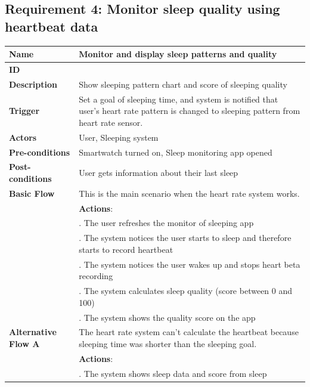 \documentclass{article}
\begin{document}
	\subsection{Requirement 4: Monitor sleep quality using heartbeat data}
	\vspace{1em}
	\begin{center}
		\small
		\begin{tabularx}{1.0\textwidth}{|>{\raggedright\arraybackslash}p{}|>{\raggedright\arraybackslash}X|}
			\hline
			\textbf{Name}               & Monitor and display sleep patterns and quality \\ \hline
			\textbf{ID}                 & 4 \\ \hline
			\textbf{Description}        & Show sleeping pattern chart and score of sleeping quality \\ \hline
			\textbf{Trigger}            & Set a goal of sleeping time, and system is notified that user's heart rate pattern is changed to sleeping pattern from heart rate sensor. \\ \hline
			\textbf{Actors}             & User, Sleeping system \\ \hline
			\textbf{Pre-conditions}     & Smartwatch turned on, Sleep monitoring app opened \\ \hline
			\textbf{Post-conditions}    & User gets information about their last sleep \\ \hline
			\textbf{Basic Flow}         & This is the main scenario when the heart rate system works. \\ \hline
										& \textbf{Actions}: \\
										& 1. The user refreshes the monitor of sleeping app \\
										& 2. The system notices the user starts to sleep and therefore starts to record heartbeat \\
										& 3. The system notices the user wakes up and stops heart beta recording \\
										& 4. The system calculates sleep quality (score between 0 and 100) \\
										& 5. The system shows the quality score on the app \\ \hline
			\textbf{Alternative Flow A} & The heart rate system can't calculate the heartbeat because sleeping time was shorter than the sleeping goal. \\ \hline
										& \textbf{Actions}: \\
										& 1. The system shows sleep data and score from sleep \\

\end{tabularx}
\end{center}
\end{document}
